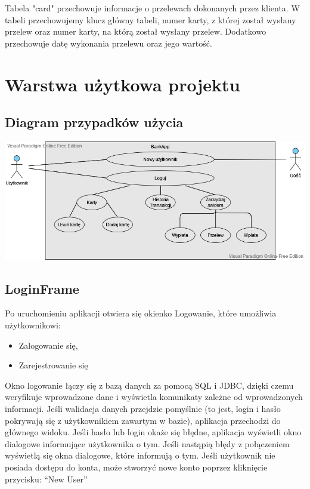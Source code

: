 \documentclass[12pt, letterpaper]{article}
\begin{document}
\quad Tabela "card"  przechowuje informacje o przelewach dokonanych przez klienta. W tabeli przechowujemy klucz główny tabeli, numer karty, z której został wysłany przelew oraz numer karty, 
na którą został wysłany przelew. Dodatkowo przechowuje datę wykonania przelewu oraz jego wartość.

\newpage


\section{Warstwa użytkowa projektu}

\subsection{Diagram przypadków użycia}

\begin{center}
	\includegraphics[scale=0.5]{UseCase}
\end{center}

\newpage

\subsection{LoginFrame}
\quad Po uruchomieniu aplikacji otwiera się okienko Logowanie, które umożliwia użytkownikowi:

\begin{itemize}
\item Zalogowanie się,
\item Zarejestrowanie się
\end{itemize}

\quad Okno logowanie łączy się z bazą danych za pomocą SQL i JDBC, dzięki czemu weryfikuje wprowadzone dane i wyświetla komunikaty zależne od wprowadzonych informacji. Jeśli walidacja danych przejdzie pomyślnie (to jest, login i hasło pokrywają się z użytkownikiem zawartym w bazie), aplikacja przechodzi do głównego widoku. Jeśli hasło lub login okaże się błędne, aplikacja wyświetli okno dialogowe informujące użytkownika o tym. Jeśli nastąpią błędy z połączeniem wyświetlą się okna dialogowe, które informują o tym. 
Jeśli użytkownik nie posiada dostępu do konta, może stworzyć nowe konto poprzez kliknięcie przycisku: “New User”\\
\end{document}
